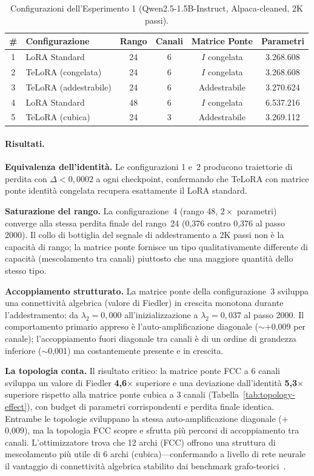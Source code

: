 \documentclass[11pt]{article}
\begin{document}
\begin{table}[t]
\centering
\caption{Configurazioni dell'Esperimento 1 (Qwen2.5-1.5B-Instruct, Alpaca-cleaned, 2K passi).}
\label{tab:exp1-configs}
\small
\begin{tabular}{@{}clcccc@{}}
\toprule
\# & Configurazione & Rango & Canali & Matrice Ponte & Parametri \\
\midrule
1 & LoRA Standard          & 24 & 6 & $I$ congelata & 3.268.608 \\
2 & TeLoRA (congelata)    & 24 & 6 & $I$ congelata & 3.268.608 \\
3 & TeLoRA (addestrabile) & 24 & 6 & Addestrabile  & 3.270.624 \\
4 & LoRA Standard          & 48 & 6 & $I$ congelata & 6.537.216 \\
5 & TeLoRA (cubica)     & 24 & 3 & Addestrabile  & 3.269.112 \\
\bottomrule
\end{tabular}
\end{table}

\paragraph{Risultati.}
\textbf{Equivalenza dell'identit\`a.} Le configurazioni 1 e~2 producono
traiettorie di perdita con $\Delta < 0{,}0002$ a ogni checkpoint,
confermando che TeLoRA con matrice ponte identit\`a congelata
recupera esattamente il LoRA standard.

\textbf{Saturazione del rango.} La configurazione~4 (rango 48,
$2\times$ parametri) converge alla stessa perdita finale del rango~24
(0,376 contro 0,376 al passo 2000). Il collo di bottiglia del segnale
di addestramento a 2K passi non \`e la capacit\`a di rango; la matrice
ponte fornisce un tipo qualitativamente differente di capacit\`a
(mescolamento tra canali) piuttosto che una maggiore quantit\`a dello
stesso tipo.

\textbf{Accoppiamento strutturato.} La matrice ponte della
configurazione~3 sviluppa una connettivit\`a algebrica (valore di
Fiedler) in crescita monotona durante l'addestramento: da
$\lambda_2 = 0{,}000$ all'inizializzazione a $\lambda_2 = 0{,}037$ al
passo 2000. Il comportamento primario appreso \`e
l'auto-amplificazione diagonale ($\sim$$+$0,009 per canale);
l'accoppiamento fuori diagonale tra canali \`e di un ordine di grandezza
inferiore ($\sim$0,001) ma costantemente presente e in crescita.

\textbf{La topologia conta.} Il risultato critico: la matrice ponte FCC
a 6 canali sviluppa un valore di Fiedler \textbf{4,6$\times$} superiore
e una deviazione dall'identit\`a \textbf{5,3$\times$} superiore rispetto
alla matrice ponte cubica a 3 canali
(Tabella~\ref{tab:topology-effect}), con budget di parametri
corrispondenti e perdita finale identica. Entrambe le topologie
sviluppano la stessa auto-amplificazione diagonale ($+$0,009), ma la
topologia FCC scopre e sfrutta pi\`u percorsi di accoppiamento tra
canali. L'ottimizzatore trova che 12 archi (FCC) offrono una struttura
di mescolamento pi\`u utile di 6 archi (cubica)---confermando a livello
di rete neurale il vantaggio di connettivit\`a algebrica stabilito dai
benchmark grafo-teorici~\cite{rhombilora_paper1}.
\end{document}
